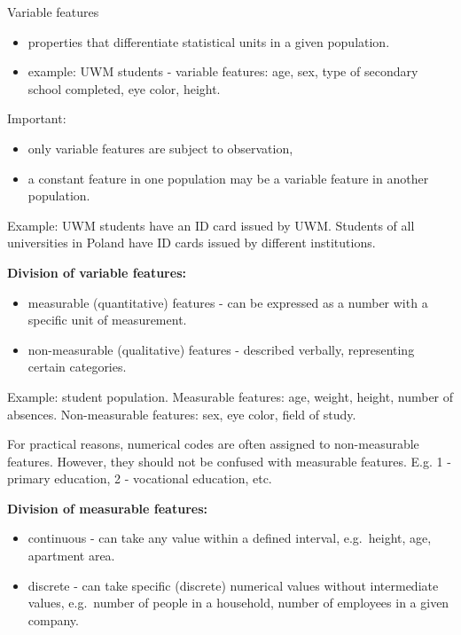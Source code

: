 \documentclass[
  english,
  letterpaper,
  DIV=11,
  numbers=noendperiod]{scrreprt}
\providecommand{\tightlist}{%
  \setlength{\itemsep}{0pt}\setlength{\parskip}{0pt}}
\begin{document}
Variable features

\begin{itemize}
\tightlist
\item
  properties that differentiate statistical units in a given population.
\item
  example: UWM students - variable features: age, sex, type of secondary
  school completed, eye color, height.
\end{itemize}

Important:

\begin{itemize}
\tightlist
\item
  only variable features are subject to observation,
\item
  a constant feature in one population may be a variable feature in
  another population.
\end{itemize}

Example: UWM students have an ID card issued by UWM. Students of all
universities in Poland have ID cards issued by different institutions.

\textbf{Division of variable features:}

\begin{itemize}
\tightlist
\item
  measurable (quantitative) features - can be expressed as a number with
  a specific unit of measurement.
\item
  non-measurable (qualitative) features - described verbally,
  representing certain categories.
\end{itemize}

Example: student population. Measurable features: age, weight, height,
number of absences. Non-measurable features: sex, eye color, field of
study.

For practical reasons, numerical codes are often assigned to
non-measurable features. However, they should not be confused with
measurable features. E.g. 1 - primary education, 2 - vocational
education, etc.

\textbf{Division of measurable features:}

\begin{itemize}
\tightlist
\item
  continuous - can take any value within a defined interval,
  e.g.~height, age, apartment area.
\item
  discrete - can take specific (discrete) numerical values without
  intermediate values, e.g.~number of people in a household, number of
  employees in a given company.
\end{itemize}
\end{document}
